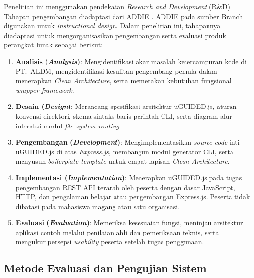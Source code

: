 \documentclass[12pt,a4paper,oneside]{report}
\begin{document}
Penelitian ini menggunakan pendekatan \textit{Research and Development} (R\&D). Tahapan pengembangan diadaptasi dari ADDIE \cite{branch2009addie}. ADDIE pada sumber Branch digunakan untuk \textit{instructional design}. Dalam penelitian ini, tahapannya diadaptasi untuk mengorganisasikan pengembangan serta evaluasi produk perangkat lunak sebagai berikut:
\begin{enumerate}
    \item \textbf{Analisis (\textit{Analysis})}: Mengidentifikasi akar masalah ketercampuran kode di PT.\ ALDM, mengidentifikasi kesulitan pengembang pemula dalam menerapkan \textit{Clean Architecture}, serta memetakan kebutuhan fungsional \textit{wrapper framework}.
    \item \textbf{Desain (\textit{Design})}: Merancang spesifikasi arsitektur uGUIDED.js, aturan konvensi direktori, skema sintaks baris perintah CLI, serta diagram alur interaksi modul \textit{file-system routing}.
    \item \textbf{Pengembangan (\textit{Development})}: Mengimplementasikan \textit{source code} inti uGUIDED.js di atas \textit{Express.js}, membangun modul generator CLI, serta menyusun \textit{boilerplate template} untuk empat lapisan \textit{Clean Architecture}.
    \item \textbf{Implementasi (\textit{Implementation})}: Menerapkan uGUIDED.js pada tugas pengembangan REST API terarah oleh peserta dengan dasar JavaScript, HTTP, dan pengalaman belajar atau pengembangan Express.js. Peserta tidak dibatasi pada mahasiswa magang atau satu organisasi.
    \item \textbf{Evaluasi (\textit{Evaluation})}: Memeriksa kesesuaian fungsi, meninjau arsitektur aplikasi contoh melalui penilaian ahli dan pemeriksaan teknis, serta mengukur persepsi \textit{usability} peserta setelah tugas penggunaan.
\end{enumerate}

\subsection{Metode Evaluasi dan Pengujian Sistem}
\end{document}
